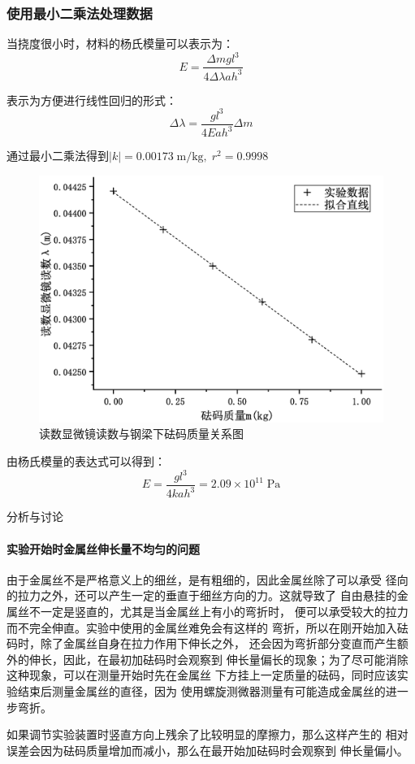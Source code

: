 \documentclass[a4paper]{ctexart}
\makeatletter
\def\Pa{\mathrm{Pa}}
\renewcommand{\section}{\@startsection{section}{1}{0mm}
	{-\baselineskip}{0.5\baselineskip}{\bf\leftline}}
\makeatother
\begin{document}
	\subsubsection{使用最小二乘法处理数据}
	\par 
	当挠度很小时，材料的杨氏模量可以表示为：
	$$
	E = \frac{\Delta mg l^{3}}{4\Delta \lambda a h^{3}}
	$$
	\par 
	表示为方便进行线性回归的形式：
	$$
	\Delta \lambda = \frac{gl^{3}}{4Eah^{3}} \Delta {m}
	$$
	\par 
	通过最小二乘法得到$|k| = 0.00173\;\mathrm{m/kg},\;r^{2} = 0.9998$
	\begin{figure}[htbp]
		\centering
		\includegraphics[scale=0.4]{3_curve.eps}
		\caption{读数显微镜读数与钢梁下砝码质量关系图}
	\end{figure}
	\par 
	由杨氏模量的表达式可以得到：
	$$
	E = \frac{gl^{3}}{4kah^{3}} = 2.09 \times 10^{11}\;\Pa
	$$
	\section{\large{分析与讨论}}
	\paragraph{实验开始时金属丝伸长量不均匀的问题}
	由于金属丝不是严格意义上的细丝，是有粗细的，因此金属丝除了可以承受
	径向的拉力之外，还可以产生一定的垂直于细丝方向的力。这就导致了
	自由悬挂的金属丝不一定是竖直的，尤其是当金属丝上有小的弯折时，
	便可以承受较大的拉力而不完全伸直。实验中使用的金属丝难免会有这样的
	弯折，所以在刚开始加入砝码时，除了金属丝自身在拉力作用下伸长之外，
	还会因为弯折部分变直而产生额外的伸长，因此，在最初加砝码时会观察到
	伸长量偏长的现象；为了尽可能消除这种现象，可以在测量开始时先在金属丝
	下方挂上一定质量的砝码，同时应该实验结束后测量金属丝的直径，因为
	使用螺旋测微器测量有可能造成金属丝的进一步弯折。
	\par 
	如果调节实验装置时竖直方向上残余了比较明显的摩擦力，那么这样产生的
	相对误差会因为砝码质量增加而减小，那么在最开始加砝码时会观察到
	伸长量偏小。
\end{document}
